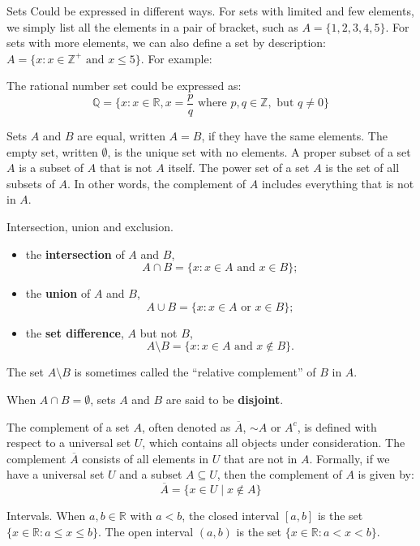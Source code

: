 \documentclass[
	12pt, %
	fleqn, %
	a4paper, %
]{LegrandOrangeBook}
\begin{document}
Sets Could be expressed in different ways. For sets with limited and few elements, we simply list all the elements in a pair of bracket, such as $A = \{1, 2, 3, 4, 5\}$. For sets with more elements, we can also define a set by description: $A = \{x: x\in \mathbb{Z^+} \text{ and } x \leq5 \}$. For example:
\begin{example}
    The rational number set could be expressed as:
    $$\mathbb{Q} = \{x: x\in \mathbb{R}, x = \frac{p}{q} \text{ where } p, q \in \mathbb{Z},\text{ but } q \neq 0\}$$
\end{example}

\begin{definition}
Sets \( A \) and \( B \) are equal, written \( A = B \), if they have the same elements. The empty set, written \( \emptyset \), is the unique set with no elements. A proper subset of a set \( A \) is a subset of \( A \) that is not \( A \) itself. The power set of a set \( A \) is the set of all subsets of \( A \).
In other words, the complement of \( A \) includes everything that is not in \( A \).
\end{definition}



\begin{definition}
Intersection, union and exclusion.
 \begin{itemize}
  \item the \textbf{intersection} of \( A \) and \( B \),
  \[ A \cap B = \{x : x \in A \text{ and } x \in B\}; \]
  \item the \textbf{union} of \( A \) and \( B \),
  \[ A \cup B = \{x : x \in A \text{ or } x \in B\}; \]
  \item the \textbf{set difference}, \( A \) but not \( B \),
  \[ A \setminus B = \{x : x \in A \text{ and } x \notin B\}. \]

\end{itemize}

The set \( A \setminus B \) is sometimes called the ``relative complement'' of \( B \) in \( A \).

When \( A \cap B = \emptyset \), sets \( A \) and \( B \) are said to be \textbf{disjoint}.
\end{definition}

\begin{definition}
The complement of a set \( A \), often denoted as \( \overline{A} \), $\sim A$ or \( A^c \), is defined with respect to a universal set \( U \), which contains all objects under consideration. The complement \( \overline{A} \) consists of all elements in \( U \) that are not in \( A \). Formally, if we have a universal set \( U \) and a subset \( A \subseteq U \), then the complement of \( A \) is given by:
\[ \overline{A} = \{ x \in U \mid x \notin A \} \]


\end{definition}
\begin{definition}[Intervals]
Intervals. When \( a, b \in \mathbb{R} \) with \( a < b \), the closed interval \( [a, b] \) is the set \( \{x \in \mathbb{R} : a \leq x \leq b\} \). The open interval \( (a, b) \) is the set \( \{x \in \mathbb{R} : a < x < b\} \).
\end{definition}
\end{document}
